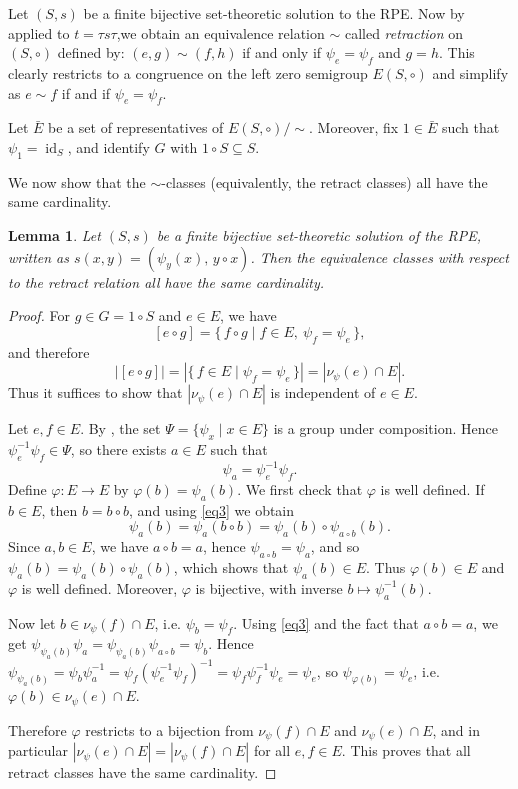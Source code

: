 \documentclass[a4paper,10pt]{amsart}
\newtheorem{lemma}{Lemma}[section]
\theoremstyle{definition}
\theoremstyle{remark}
\DeclareMathOperator{\id}{id}
\begin{document}
Let $(S,s)$ be a finite bijective set-theoretic solution to the RPE. Now by \cite[Proposition 3.4]{COvA} applied to $t = \tau s \tau$,we obtain an equivalence relation $\sim$ called \emph{retraction} on $(S,\circ)$ defined by: $(e,g) \sim (f,h)$ if and only if $\psi_e = \psi_f$ and $g=h$. This clearly restricts to a congruence on the left zero semigroup $E(S,\circ)$ and simplify as $e\sim f$ if and if $\psi_e = \psi_f$.

Let $\bar{E}$ be a set of representatives of $E(S,\circ)/\sim$. Moreover, fix $1\in \bar{E}$ such that
$\psi_{1}=\id_S$, and identify $G$ with $1\circ S\subseteq S$.


We now show that the $\sim$-classes (equivalently, the retract classes) all have the same cardinality.

\begin{lemma}\label{cardinality_of_fibers}
    Let $(S,s)$ be a finite bijective set-theoretic solution of the RPE, written as
    $s(x,y)=(\psi_y(x),\,y\circ x)$. Then the equivalence classes with respect to the retract relation all have the same cardinality.
\end{lemma}
\begin{proof}
    For $g\in G=1\circ S$ and $e\in E$, we have
    $$[e\circ g]=\{\,f\circ g \mid f\in E,\ \psi_f=\psi_e\,\},$$
    and therefore
    $$|[e\circ g]|=\left|\{\,f\in E \mid \psi_f=\psi_e\,\}\right|=|\nu_{\psi}(e)\cap E|.$$
    Thus it suffices to show that $|\nu_{\psi}(e)\cap E|$ is independent of $e\in E$.
    
    Let $e,f\in E$. By , the set $\Psi=\{\psi_x\mid x\in E\}$ is a group under composition. Hence
    $\psi_e^{-1}\psi_f\in \Psi$, so there exists $a\in E$ such that
    $$\psi_a=\psi_e^{-1}\psi_f.$$
    Define $\varphi:E\to E$ by $\varphi(b)=\psi_a(b)$.
    We first check that $\varphi$ is well defined. If $b\in E$, then $b=b\circ b$, and using \eqref{eq3} we obtain
    $$\psi_a(b)=\psi_a(b\circ b)=\psi_a(b)\circ \psi_{a\circ b}(b).$$
    Since $a, b\in E$, we have $a\circ b=a$, hence $\psi_{a\circ b}=\psi_a$, and so
    $\psi_a(b)=\psi_a(b)\circ \psi_a(b)$, which shows that $\psi_a(b)\in E$. Thus $\varphi(b)\in E$ and $\varphi$ is well defined. Moreover, $\varphi$ is bijective, with inverse $b\mapsto \psi_a^{-1}(b)$.
    
    Now let $b\in \nu_{\psi}(f)\cap E$, i.e. $\psi_b=\psi_f$. Using \eqref{eq3} and the fact that $a\circ b=a$, we get
    $\psi_{\psi_a(b)}\psi_a= \psi_{\psi_a(b)}\psi_{a\circ b}=\psi_b$.
    Hence
    $\psi_{\psi_a(b)}=\psi_b\psi_a^{-1}
    =\psi_f(\psi_e^{-1}\psi_f)^{-1}
    =\psi_f\psi_f^{-1}\psi_e
    =\psi_e$,
    so $\psi_{\varphi(b)}=\psi_e$, i.e.\ $\varphi(b)\in \nu_{\psi}(e)\cap E$.
    
    Therefore $\varphi$ restricts to a bijection from $\nu_{\psi}(f)\cap E$
    and $ \nu_{\psi}(e)\cap E$,
    and in particular $|\nu_{\psi}(e)\cap E|=|\nu_{\psi}(f)\cap E|$ for all $e,f\in E$. This proves that all retract classes have the same cardinality.
\end{proof}
\end{document}
